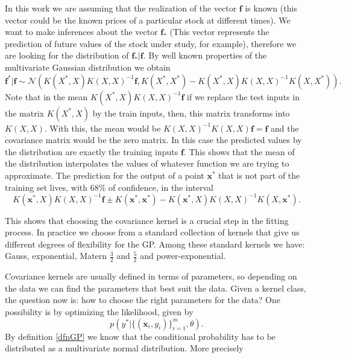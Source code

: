\documentclass{article}
\newcommand{\x}{\textbf{x}}
\begin{document}
In this work we are assuming that the realization of the vector $\textbf{f}$ is known (this vector could be
the known prices of a particular stock at different times).
We want to make inferences about the vector $\textbf{f}_{*}$ (This vector represents the prediction of  future values
 of the stock under study, for example),
therefore we are looking for the distribution of $\textbf{f}_{*}|\textbf{f}$. By well known properties
of the multivariate Gaussian distribution we  obtain  \cite{lifshits2013gaussian}
\begin{equation}\label{eqnformulameancovariance}
\textbf{f}^{*}|\textbf{f}\sim\mathscr{N}\left(K(X^{*},X)K(X,X)^{-1}\textbf{f},
K(X^{*},X^{*})-K(X^{*},X)K(X,X)^{-1}K(X,X^{*})\right).
\end{equation}
Note that in the mean $K(X^{*},X)K(X,X)^{-1}\textbf{f}$ if we replace the test inputs in the matrix
$K(X^{*},X)$ by the train inputs, then, this matrix transforms into $K(X,X)$. With this, the mean
would be $K(X,X)^{-1}K(X,X)\textbf{f}=\textbf{f}$ and the covariance matrix would be the zero matrix. 
In this case the predicted values by the distribution are exactly the training inputs $\textbf{f}$.
This shows that the mean of the distribution interpolates the values  of whatever function we are trying to 
approximate. The prediction for
the output of 
a point $\textbf{x}^{*}$ that is not part of the training set lives, with $68\%$ of confidence, in the interval
\begin{equation*}
K(\textbf{x}^{*},X)K(X,X)^{-1}\textbf{f}\pm K(\textbf{x}^{*},\textbf{x}^{*})-
K(\textbf{x}^{*},X)K(X,X)^{-1}K(X,\textbf{x}^{*}).
\end{equation*}

This shows that choosing the covariance kernel 
is a crucial step in the fitting process. In practice we choose from a standard collection of kernels
that give us different degrees of flexibility for the GP. Among these standard kernels we have: Gauss,
exponential, Matern $\frac{3}{2}$ and $\frac{5}{2}$ and power-exponential.

Covariance kernels are usually defined in terms of parameters, so depending on the data 
we can find the parameters that best suit the data. Given a kernel class, the question now is: how
to choose the right parameters for the data? One possibility is by optimizing the likelihood, given by
\begin{equation*}
p(y^{*}|\{(\x_{i},y_{i})\}_{i=1}^{m},\theta).
\end{equation*}
By definition \ref{dfnGP} we know that the conditional probability has to be distributed as
a multivariate normal distribution. More precisely
\end{document}
